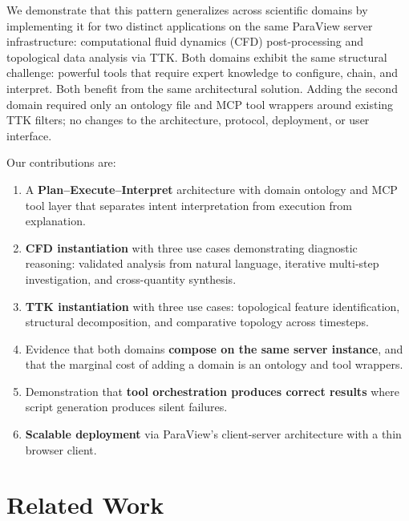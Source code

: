 \documentclass{vgtc}                          %
\begin{document}
We demonstrate that this pattern generalizes across scientific domains by
implementing it for two distinct applications on the same ParaView server
infrastructure: computational fluid dynamics (CFD) post-processing and
topological data analysis via TTK.
Both domains exhibit the same structural challenge: powerful tools that
require expert knowledge to configure, chain, and interpret. Both
benefit from the same architectural solution.
Adding the second domain required only an ontology file and MCP tool wrappers
around existing TTK filters; no changes to the architecture, protocol,
deployment, or user interface.

Our contributions are:
\begin{enumerate}
\item A \textbf{Plan--Execute--Interpret} architecture with domain ontology
and MCP tool layer that separates intent interpretation from execution from
explanation.
\item \textbf{CFD instantiation} with three use cases demonstrating diagnostic
reasoning: validated analysis from natural language, iterative multi-step
investigation, and cross-quantity synthesis.
\item \textbf{TTK instantiation} with three use cases: topological feature
identification, structural decomposition, and comparative topology across
timesteps.
\item Evidence that both domains \textbf{compose on the same server instance},
and that the marginal cost of adding a domain is an ontology and tool wrappers.
\item Demonstration that \textbf{tool orchestration produces correct results}
where script generation produces silent failures.
\item \textbf{Scalable deployment} via ParaView's client-server architecture
with a thin browser client.
\end{enumerate}


\section{Related Work}
\end{document}
